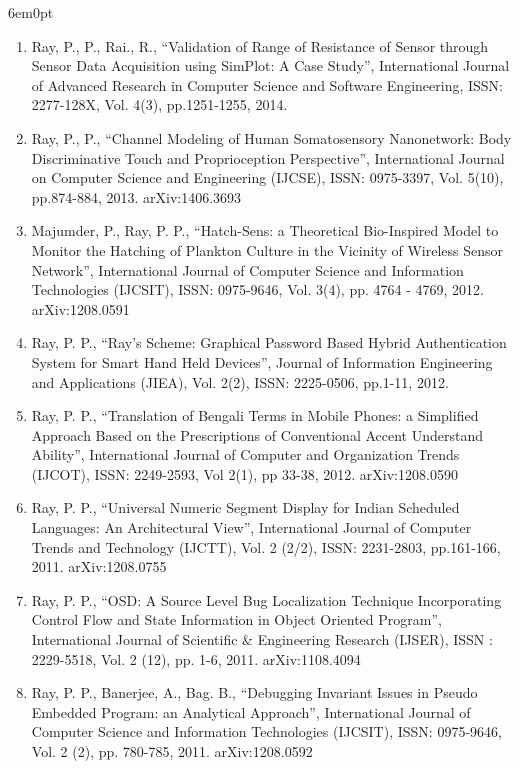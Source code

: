 \documentclass[11pt,a4paper]{moderncv}
\begin{document}
\begin{adjustwidth}{6em}{0pt}
\begin{enumerate}
		\vspace{0.5cm}
		
		\item	Ray, P., P., Rai., R., “Validation of Range of Resistance of Sensor through Sensor Data Acquisition using SimPlot: A Case Study”, International Journal of Advanced Research in Computer Science and Software Engineering, ISSN: 2277-128X, Vol. 4(3), pp.1251-1255, 2014.
		
		\item	Ray, P., P., “Channel Modeling of Human Somatosensory Nanonetwork: Body Discriminative Touch and Proprioception Perspective”, International Journal on Computer Science and Engineering (IJCSE), ISSN: 0975-3397, Vol. 5(10), pp.874-884, 2013. arXiv:1406.3693 
		
		
		\item	Majumder, P., Ray, P. P., “Hatch-Sens: a Theoretical Bio-Inspired Model to Monitor the Hatching of Plankton Culture in the Vicinity of Wireless Sensor Network”, International Journal of Computer Science and Information Technologies (IJCSIT), ISSN: 0975-9646, Vol. 3(4), pp. 4764 - 4769, 2012. arXiv:1208.0591 
		
		\item	Ray, P. P., “Ray’s Scheme: Graphical Password Based Hybrid Authentication System for Smart   Hand Held Devices”, Journal of Information Engineering and Applications (JIEA), Vol. 2(2), ISSN: 2225-0506, pp.1-11, 2012. 
		
		\item Ray, P. P., “Translation of Bengali Terms in Mobile Phones: a Simplified Approach Based on the Prescriptions of Conventional Accent Understand Ability”, International Journal of Computer and Organization Trends (IJCOT), ISSN: 2249-2593, Vol 2(1), pp 33-38, 2012. arXiv:1208.0590
		
		\item	Ray, P. P., “Universal Numeric Segment Display for Indian Scheduled Languages: An Architectural View”, International Journal of Computer Trends and Technology (IJCTT), Vol. 2 (2/2), ISSN: 2231-2803, pp.161-166, 2011. arXiv:1208.0755 
		
		\item	Ray, P. P., “OSD: A Source Level Bug Localization Technique Incorporating Control Flow and  State Information in Object Oriented Program”, International Journal of Scientific \& Engineering Research (IJSER), ISSN : 2229-5518, Vol. 2 (12), pp. 1-6, 2011. arXiv:1108.4094
		
		
		\item  Ray, P. P., Banerjee, A., Bag. B., “Debugging Invariant Issues in Pseudo Embedded Program: an Analytical Approach”, International Journal of Computer Science and Information Technologies (IJCSIT), ISSN: 0975-9646, Vol. 2 (2), pp. 780-785, 2011. arXiv:1208.0592 
		

\end{enumerate}
\end{adjustwidth}
\end{document}

